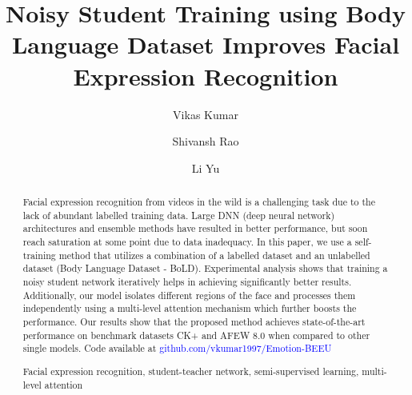 \documentclass[runningheads]{llncs}
\begin{document}
\newcommand*\samethanks[1][\value{footnote}]{\footnotemark[#1]}
\pagestyle{headings}
\mainmatter
\def\ECCV16SubNumber{4\textbf{}}  

\title{Noisy Student Training using Body Language Dataset Improves Facial Expression Recognition} 
\author{Vikas Kumar
\and
Shivansh Rao\inst{\samethanks}
\and
Li Yu\inst{}
}


\maketitle

\begin{abstract}
Facial expression recognition from videos in the wild is a  challenging task due to the lack of abundant labelled training data. Large DNN (deep neural network) architectures and ensemble methods have resulted in better performance, but soon reach saturation at some point due to data inadequacy. In this paper, we use a self-training method that utilizes a combination of a labelled dataset and an unlabelled dataset (Body Language Dataset - BoLD). Experimental analysis shows that training a noisy student network iteratively helps in achieving significantly better results. Additionally, our model isolates different regions of the face and processes them independently using a multi-level attention mechanism which further boosts the performance.  Our results show that the proposed method achieves state-of-the-art performance on benchmark datasets CK+ and AFEW 8.0 when compared to other single models. Code available at \textcolor{blue}{github.com/vkumar1997/Emotion-BEEU}




\keywords Facial  expression  recognition, student-teacher network, semi-supervised  learning,  multi-level attention
\end{abstract}
\end{document}
